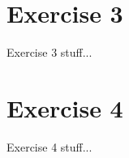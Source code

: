 \documentclass{article}
\begin{document}
  \section{Exercise 3}
    Exercise 3 stuff...

  \section{Exercise 4}
    Exercise 4 stuff...
\end{document}
